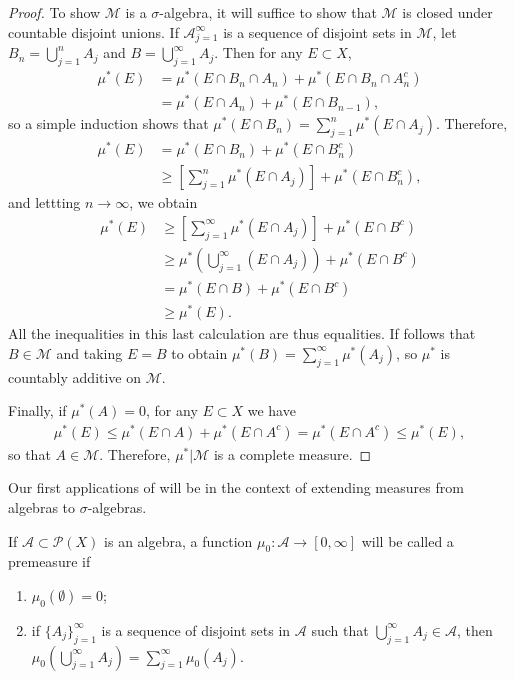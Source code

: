 \begin{proof}
    To show $\mathcal{M}$ is a $\sigma$-algebra, it will suffice to show that $\mathcal{M}$ is closed under countable disjoint unions.
    If $\mathcal{A}_{j=1}^{\infty}$ is a sequence of disjoint sets in $\mathcal{M}$, let $B_n = \bigcup_{j=1}^{n} A_j$ and $B = \bigcup_{j=1}^{\infty} A_j$.
    Then for any $E \subset X$,
    \begin{align}
        \mu^*(E) &= \mu^*(E \cap B_n \cap A_n) + \mu^*(E \cap B_n \cap A_n^c) \\
        &= \mu^*(E \cap A_n) + \mu^*(E \cap B_{n-1}),
    \end{align}
    so a simple induction shows that $\mu^*(E \cap B_n) = \sum_{j=1}^{n} \mu^*(E \cap A_j)$.
    Therefore,
    \begin{align}
        \mu^*(E) &= \mu^*(E \cap B_n) + \mu^*(E \cap B_n^c) \\
        &\ge \left[ \sum_{j=1}^{n} \mu^*(E \cap A_j) \right] + \mu^*(E \cap B_n^c),
    \end{align}
    and lettting $n \to \infty$, we obtain
    \begin{align}
        \mu^*(E) &\ge \left[ \sum_{j=1}^{\infty} \mu^*(E \cap A_j) \right] + \mu^*(E \cap B^c) \\
        &\ge \mu^*\left( \bigcup_{j=1}^{\infty} (E \cap A_j) \right) + \mu^*(E \cap B^c) \\
        &= \mu^*(E \cap B) + \mu^*(E \cap B^c) \\
        &\ge \mu^*(E).
    \end{align}
    All the inequalities in this last calculation are thus equalities.
    If follows that $B \in \mathcal{M}$ and taking $E = B$ to obtain $\mu^*(B) = \sum_{j=1}^{\infty} \mu^*(A_j)$, so $\mu^*$ is countably additive on $\mathcal{M}$.

    Finally, if $\mu^*(A) = 0$, for any $E \subset X$ we have
    \begin{align}
        \mu^*(E) \le \mu^*(E \cap A) + \mu^*(E \cap A^c) = \mu^*(E \cap A^c) \le \mu^*(E),
    \end{align}
    so that $A \in \mathcal{M}$.
    Therefore, $\mu^*|\mathcal{M}$ is a complete measure.
\end{proof}

Our first applications of  will be in the context of extending measures from algebras to $\sigma$-algebras.

\begin{definition}[Premeasure]
    If $\mathcal{A} \subset \mathcal{P}(X)$ is an algebra, a function $\mu_0: \mathcal{A} \to [0, \infty]$ will be called a premeasure if
    \begin{enumerate}
        \item $\mu_0(\emptyset) = 0$;
        \item if $\{ A_j \}_{j=1}^{\infty}$ is a sequence of disjoint sets in $\mathcal{A}$ such that $\bigcup_{j=1}^{\infty} A_j \in \mathcal{A}$, then $\mu_0(\bigcup_{j=1}^{\infty} A_j) = \sum _{j=1}^{\infty} \mu_0(A_j)$.
    \end{enumerate}
\end{definition}

